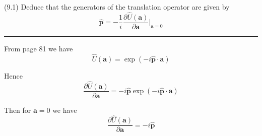 \documentclass[12pt]{article}
\begin{document}
(9.1)
Deduce that the generators of the translation operator
are given by
\begin{equation*}
\hat{\mathbf p}=-\frac{1}{i}
\frac{\partial\hat U(\mathbf a)}{\partial\mathbf a}\bigg|_{\mathbf a=0}
\tag{9.51}
\end{equation*}

\bigskip
\hrule

\bigskip
From page 81 we have
\begin{equation*}
\hat U(\mathbf a)=\exp(-i\hat{\mathbf p}\cdot\mathbf a)
\end{equation*}

Hence
\begin{equation*}
\frac{\partial\hat U(\mathbf a)}{\partial\mathbf a}=-i\hat{\mathbf p}\exp(-i\hat{\mathbf p}\cdot\mathbf a)
\end{equation*}

Then for $\mathbf a=0$ we have
\begin{equation*}
\frac{\partial\hat U(\mathbf a)}{\partial\mathbf a}=-i\hat{\mathbf p}
\end{equation*}
\end{document}
